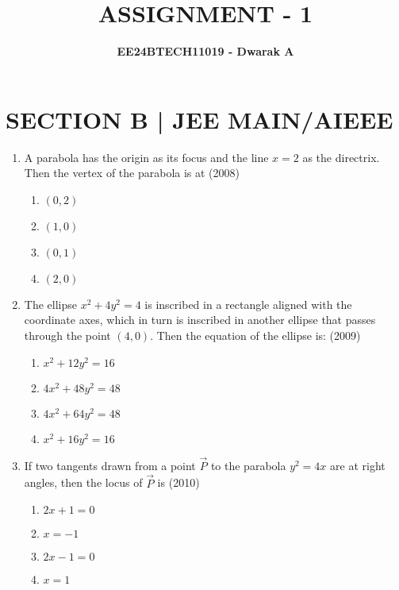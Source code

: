 \documentclass[journal,12pt,twocolumn]{IEEEtran}
\theoremstyle{remark}
\begin{document}

\vspace{3cm}

\title{\textbf{ASSIGNMENT - 1}}
\author{\textbf{EE24BTECH11019 - Dwarak A}}
\maketitle
\newpage
\bigskip

\renewcommand{\thefigure}{\theenumi}
\renewcommand{\thetable}{\theenumi}

\section*{\textbf{SECTION B | JEE MAIN/AIEEE}}
\bigskip

\begin{enumerate}
    \item A parabola has the origin as its focus and the line $x=2$ as the directrix. Then the vertex of the parabola is at
    \hfill(2008)

    \begin{enumerate}[label=(\alph*)]
    \item$(0,2)$
    \item$(1,0)$
    \item$(0,1)$
    \item$(2,0)$ \\
    \end{enumerate}
    
    \item The ellipse $x^2+4y^2=4$ is inscribed in a rectangle aligned with the coordinate axes, which in turn is inscribed in another ellipse that passes through the point $(4,0)$. Then the equation of the ellipse is:
    \hfill(2009)

    \begin{enumerate}[label=(\alph*)]
    \item$x^2+12y^2=16$
    \item$4x^2+48y^2=48$
    \item$4x^2+64y^2=48$
    \item$x^2+16y^2=16$ \\
    \end{enumerate}

    \item If two tangents drawn from a point $\vec{P}$ to the parabola $y^2=4x$ are at right angles, then the locus of $\vec{P}$ is
    \hfill(2010)
    
    \begin{enumerate}[label=(\alph*)]
    \item$2x+1=0$
    \item$x=-1$
    \item$2x-1=0$
    \item$x=1$ \\
    \end{enumerate}


\end{enumerate}
\end{document}
